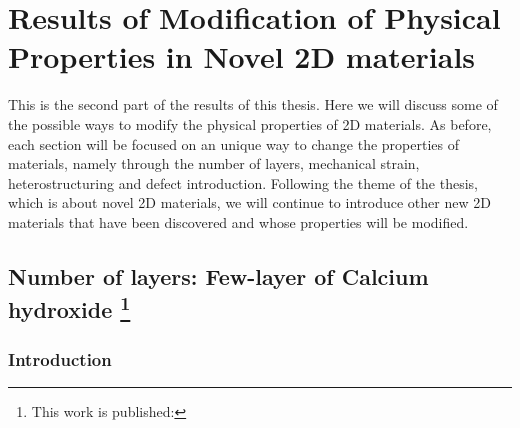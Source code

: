 
\chapter{Results of Modification of Physical Properties in Novel 2D materials \label{chap:5}}

\ifpdf
    \graphicspath{{Chapter5/Figs/Raster/}{Chapter5/Figs/PDF/}{Chapter5/Figs/}{Chapter5/Figs/Vector/}}
\else
    \graphicspath{{Chapter5/Figs/Vector/}{Chapter5/Figs/}}
\fi

This is the second part of the results of this thesis. Here we will discuss some of the possible ways to modify the physical properties of 2D materials. As before, each section will be focused on an unique way to change the properties of materials, namely through the number of layers, mechanical strain, heterostructuring and defect introduction. Following the theme of the thesis, which is about novel 2D materials, we will continue to introduce other new 2D materials that have been discovered and whose properties will be modified. 

\section[Number of layers: Few-layer of Calcium hydroxide]{Number of layers: Few-layer of Calcium hydroxide \footnote{This work is published:\cite{Aierken2015.porlandite}} \label{CaOH2_layers}}

\subsection{Introduction}

